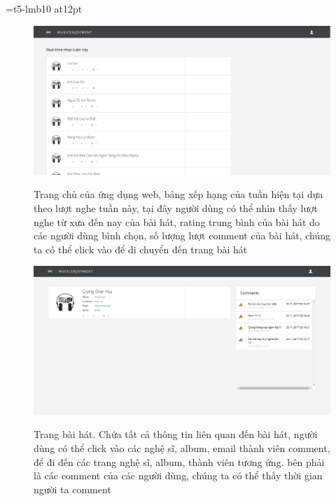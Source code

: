 \documentclass[12pt,a4paper,oneside,openright]{article}
\numberwithin{subsection}{section}
\theoremstyle{definition}
\theoremstyle{plain}
\theoremstyle{definition}
\theoremstyle{definition}
\theoremstyle{remark}
\theoremstyle{definition}
\begin{document}
\font\chuong=t5-lmb10 at12pt%
 \def\chaptername{\chuong CHƯƠNG}
\fontsize{14pt}{14pt}\selectfont%

\newcommand{\set}[1]{\mathbb{#1}}
\providecommand{\keywords}[1]{\textbf{\textit{Từ khóa---}} #1}


\begin{figure}[h!]
  \caption{Trang chủ của ứng dụng web, bảng xếp hạng của tuần hiện tại dựa theo lượt nghe tuần này, tại đây người dùng có thể nhìn thấy lượt nghe từ xưa đến nay của bài hát, rating trung bình của bài hát do các người dùng bình chọn,  số lượng lượt comment của bài hát, chúng ta có thể click vào để di chuyển đến trang bài hát}
  \includegraphics[width=\textwidth]{bxh.png}
  \label{bxh}
\end{figure}


\begin{figure}[h!]
  \caption{Trang bài hát. Chứa tất cả thông tin liên quan đến bài hát, người dùng có thể click vào các nghệ sĩ, album, email thành viên comment, để đi đến các trang nghệ sĩ, album, thành viên tương ứng. bên phải là các comment của các người dùng, chúng ta có thể thấy thời gian người ta comment}
  \includegraphics[width=\textwidth]{nhac.png}
  \label{nhac}
\end{figure}
\end{document}
